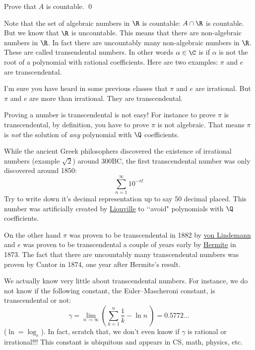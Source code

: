 \begin{ex}
  Prove that $A$ is countable.
  \qed
\end{ex}

Note that the set of algebraic numbers in $\R$ is countable:
$A \cap \R$ is countable.
But we know that $\R$ is uncountable.
This means that there are non-algebraic numbers in $\R$.
In fact there are uncountably many non-algebraic numbers in $\R$.
These are called transendental numbers.
In other words $\alpha \in \C$ is 
if $\alpha$ is not the root of a polynomial with rational coefficients.
Here are two examples: $\pi$ and $e$ are transcendental.

I'm sure you have heard in some previous classes that $\pi$ and $e$
are irrational.
But $\pi$ and $e$ are more than irrational.
They are transcendental.

Proving a number is transcendental is not easy!
For instance to prove $\pi$ is transcendental, by definition,
you have to prove $\pi$ is not algebraic.
That means $\pi$ is \textit{not} the solution of \textit{any} polynomial
with $\Q$ coefficients.

While the ancient Greek philosophers discovered the existence of
irrational numbers (example $\sqrt{2}$) around 300BC,
the first transcendental number was only discovered around 1850:
\[
\sum_{n = 1}^\infty 10^{-n!}
\]
Try to write down it's decimal representation up to say 50 decimal placed.
This number was artificially created by
\href{https://en.wikipedia.org/wiki/Joseph_Liouville}{Liouville}
to \lq\lq avoid"
polynomials with $\Q$ coefficients.

On the other hand $\pi$ was proven to be transcendental in
1882 by
\href{https://en.wikipedia.org/wiki/Ferdinand_von_Lindemann}{von Lindemann}
and $e$ was proven to be transcendental a couple of years early by
\href{https://en.wikipedia.org/wiki/Charles_Hermite}{Hermite} in 1873.
The fact that there are uncountably many transcendental numbers
was proven by Cantor in 1874, one year after Hermite's result.

We actually know very little about transcendental numbers.
For instance, we do not know if the following constant,
the Euler–Mascheroni constant, is
transcendental or not:
\[
\gamma = \lim_{n \rightarrow \infty}
\left(
\sum_{k = 1}^n \frac{1}{k}
-
\ln n
\
\right)
= 0.5772...
\]
($\ln = \log_e$).
In fact, scratch that, we don't even know if $\gamma$ is rational or
irrational!!!
This constant is ubiquitous and appears in CS, math, physics, etc.


